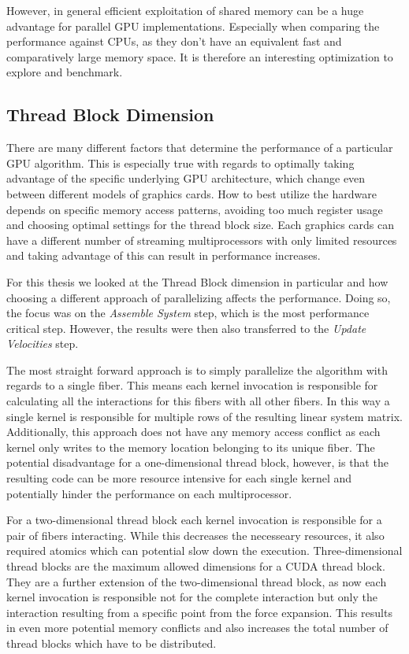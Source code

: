 \documentclass[a4paper,11pt]{kth-mag}
\begin{document}
However, in general efficient exploitation of shared memory can be a huge advantage for parallel GPU implementations. Especially when comparing the performance against CPUs, as they don't have an equivalent fast and comparatively large memory space. It is therefore an interesting optimization to explore and benchmark.

\subsection{Thread Block Dimension}

There are many different factors that determine the performance of a particular GPU algorithm. This is especially true with regards to optimally taking advantage of the specific underlying GPU architecture, which change even between different models of graphics cards. How to best utilize the hardware depends on specific memory access patterns, avoiding too much register usage and choosing optimal settings for the thread block size. Each graphics cards can have a different number of streaming multiprocessors with only limited resources and taking advantage of this can result in performance increases.

For this thesis we looked at the Thread Block dimension in particular and how choosing a different approach of parallelizing affects the performance. Doing so, the focus was on the \emph{Assemble System} step, which is the most performance critical step. However, the results were then also transferred to the \emph{Update Velocities} step.

The most straight forward approach is to simply parallelize the algorithm with regards to a single fiber. This means each kernel invocation is responsible for calculating all the interactions for this fibers with all other fibers. In this way a single kernel is responsible for multiple rows of the resulting linear system matrix. Additionally, this approach does not have any memory access conflict as each kernel only writes to the memory location belonging to its unique fiber. The potential disadvantage for a one-dimensional thread block, however, is that the resulting code can be more resource intensive for each single kernel and potentially hinder the performance on each multiprocessor.

For a two-dimensional thread block each kernel invocation is responsible for a pair of fibers interacting. While this decreases the necesseary resources, it also required atomics which can potential slow down the execution. Three-dimensional thread blocks are the maximum allowed dimensions for a CUDA thread block. They are a further extension of the two-dimensional thread block, as now each kernel invocation is responsible not for the complete interaction but only the interaction resulting from a specific point from the force expansion. This results in even more potential memory conflicts and also increases the total number of thread blocks which have to be distributed.
\end{document}
